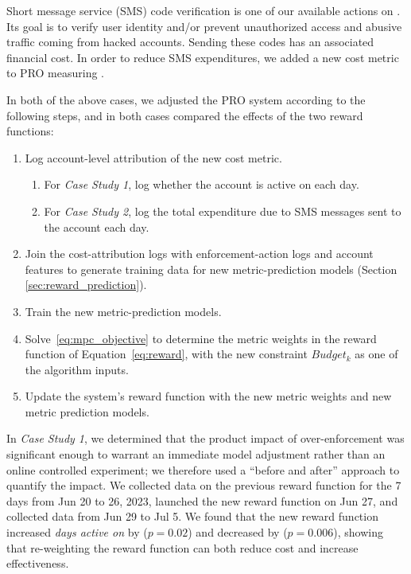 Short message service (SMS) code verification is one of our available actions on \ig. Its goal is to verify user identity and/or prevent unauthorized access and abusive traffic coming from hacked accounts. Sending these codes has an associated financial cost. In order to reduce SMS expenditures, we added a new cost metric to PRO measuring {\smscost}.

\medskip \noindent
In both of the above cases, we adjusted the PRO system according to the following steps, and in both cases compared the effects of the two reward functions:

\begin{enumerate}
\squeezelist
  \item Log account-level attribution of the new cost metric.
  \vspace{-6pt}
  \begin{enumerate}
  \squeezelist
    \item For \emph{Case Study 1}, log whether the account is active on \surface each day.
    \item For \emph{Case Study 2}, log the total expenditure due to SMS messages sent to the account each day.
  \end{enumerate}
  \vspace{-4pt}
  \item Join the cost-attribution logs with enforcement-action logs and account features to generate training data for new metric-prediction models (Section \ref{sec:reward_prediction}).
  \item Train the new metric-prediction models.
  \item Solve~\eqref{eq:mpc_objective} to determine the metric weights in the reward function of Equation~\eqref{eq:reward}, with the new constraint $Budget_k$ as one of the algorithm inputs.
  \item Update the system's reward function with the new metric weights and new metric prediction models.
\end{enumerate}


In \emph{Case Study 1}, we determined that the product impact of over-enforcement was significant enough to warrant an immediate model adjustment rather than an online controlled experiment; we therefore used a ``before and after'' approach to quantify the impact. We collected data on the previous reward function for the 7 days from Jun 20 to 26, 2023, launched the new reward function on Jun 27, and collected data from Jun 29 to Jul 5. We found that the new reward function increased \emph{days active on \surface} by \textbf{\mwebdaulossreduction} ($p = 0.02$) and decreased \scraping by \textbf{\mwebscrapingreduction} ($p = 0.006$), showing that re-weighting the reward function can both reduce cost and increase effectiveness.

